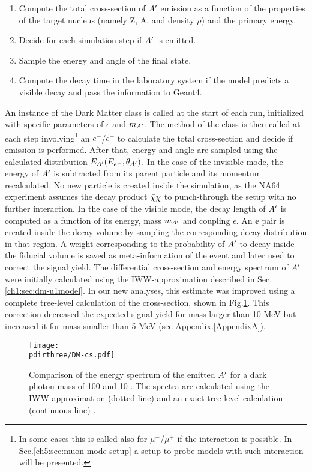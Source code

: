 \begin{enumerate}
\item Compute the total cross-section of $A'$ emission as a function of the properties of the target nucleus (namely Z, A, and density $\rho$) and the primary energy.
\item Decide for each simulation step if $A'$ is emitted.
\item Sample the energy and angle of the final state.
\item Compute the decay time in the laboratory system if the model predicts a visible decay and pass the information to Geant4.
\end{enumerate}

An instance of the Dark Matter class is called at the start of each run, initialized with specific parameters of $\epsilon$ and $m_{A'}$. The method of the class is then called at each step involving\footnote{In some cases this is called also for $\mu^-$/$\mu^+$ if the interaction is possible. In Sec.\ref{ch5:sec:muon-mode-setup} a setup to probe models with such interaction will be presented.} an $e^-$/$e^+$ to calculate the total cross-section and decide if emission is performed. After that, energy and angle are sampled using the calculated distribution $E_{A'}(E_{e^-}, \theta_{A'})$. In the case of the invisible mode, the energy of $A'$ is subtracted from its parent particle and its momentum recalculated. No new particle is created inside the simulation, as the NA64 experiment assumes the decay product $\bar{\chi} \chi$ to punch-through the setup with no further interaction. In the case of the visible mode, the decay length of $A'$ is computed as a function of its energy, mass $m_{A'}$ and coupling $\epsilon$. An $\ee$ pair is created inside the decay volume by sampling the corresponding decay distribution in that region. A weight corresponding to the probability of $A'$ to decay inside the fiducial volume is saved as meta-information of the event and later used to correct the signal yield.
The differential cross-section and energy spectrum of $A'$ were initially calculated using the IWW-approximation described in Sec.\ref{ch1:sec:dm-u1model}. In our new analyses, this estimate was improved using a complete tree-level calculation of the cross-section, shown in Fig.\ref{fig:dm-iww-tl}. This correction decreased the expected signal yield for mass larger than 10 MeV but increased it for mass smaller than 5 MeV \cite{DMsimulation} (see Appendix.\ref{AppendixA}).

\begin{figure}[htb!]
  \centering
  \texttt{[image: \\pdirthree/DM-cs.pdf]}
  \caption[IWW vs tree-level energy spectra]{Comparison of the energy spectrum of the emitted $A'$ for a dark photon mass of 100 \mev and 10 \mev. The spectra are calculated using the IWW approximation (dotted line) and an exact tree-level calculation (continuous line) \cite{DMsimulation}.}
  \label{fig:dm-iww-tl}
\end{figure}



